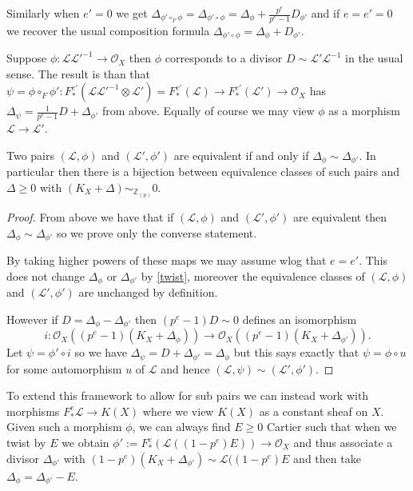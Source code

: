 \documentclass[a4paper,12pt]{book}
\newcommand{\Fe}{F^{e}_{*}}
\newcommand{\ox}{\mathcal{O}_{X}}
\newcommand{\zp}{\mathbb{Z}_{(p)}}
\begin{document}
Similarly when $e'=0$ we get $\Delta_{\phi' \circ_{F} \phi}=\Delta_{\phi' \circ \phi}=\Delta_{\phi} + \frac{p^{e}}{p^{e}-1}D_{\phi'}$ and if $e=e'=0$ we recover the usual composition formula $\Delta_{\phi' \circ \phi}=\Delta_{\phi} + D_{\phi'}$.

Suppose $\phi: \mathcal{L}\mathcal{L'}^{-1} \to \ox$ then $\phi$ corresponds to a divisor $D\sim \mathcal{L'}\mathcal{L}^{-1}$ in the usual sense. The result is than that $\psi=\phi \circ_{F} \phi': F_{*}^{e'}(\mathcal{L}\mathcal{L'}^{-1} \otimes \mathcal{L'})=F_{*}^{e'}(\mathcal{L}) \to F_{*}^{e'}(\mathcal{L'})\to\ox$ has $\Delta_{\psi}=\frac{1}{p^{e}-1}D+\Delta_{\phi'}$ from above. Equally of course we may view $\phi$ as a morphism $\mathcal{L} \to \mathcal{L'}$. 

\begin{lemma}
	
	Two pairs $(\mathcal{L}, \phi)$ and $(\mathcal{L}', \phi')$ are equivalent if and only if $\Delta_{\phi}\sim \Delta_{\phi'}$. In particular then there is a bijection between equivalence classes of such pairs and $\Delta \geq 0$ with $(K_{X}+\Delta)\sim_{\zp} 0$.
	
	
	\end{lemma}

\begin{proof}
	
	From above we have that if $(\mathcal{L}, \phi)$ and $(\mathcal{L}', \phi')$ are equivalent then $\Delta_{\phi}\sim \Delta_{\phi'}$ so we prove only the converse statement.
	
	By taking higher powers of these maps we may assume wlog that $e=e'$. This does not change $\Delta_{\phi}$ or $\Delta_{\phi'}$ by \autoref{twist}, moreover the equivalence classes of $(\mathcal{L}, \phi)$ and $(\mathcal{L}', \phi')$ are unchanged by definition.
	
	However if $D=\Delta_{\phi}-\Delta_{\phi'}$ then $(p^{e}-1)D \sim 0$ defines an isomorphism $$i:\ox((p^{e}-1)(K_{X}+\Delta_{\phi}))\to \ox ((p^{e}-1)(K_{X}+\Delta_{\phi'})).$$ Let $\psi=\phi' \circ i$ so we have $\Delta_{\psi}=D+\Delta_{\phi'}=\Delta_{\phi}$ but this says exactly that $\psi=\phi\circ u$ for some automorphism $u$ of $\mathcal{L}$ and hence $(\mathcal{L},\psi)\sim(\mathcal{L'},\phi')$. 
	
\end{proof}

To extend this framework to allow for sub pairs we can instead work with morphisms $\Fe\mathcal{L} \to K(X)$ where we view $K(X)$ as a constant sheaf on $X$. Given such a morphism $\phi$, we can always find $E \geq 0$ Cartier such that when we twist by $E$ we obtain $\phi':=\Fe(\mathcal{L}((1-p^{e})E)) \to \ox$ and thus associate a divisor $\Delta_{\phi'}$ with $(1-p^{e})(K_{X}+\Delta_{\phi'})\sim \mathcal{L}((1-p^{e})E$ and then take $\Delta_{\phi}=\Delta_{\phi'}-E$.
\end{document}
